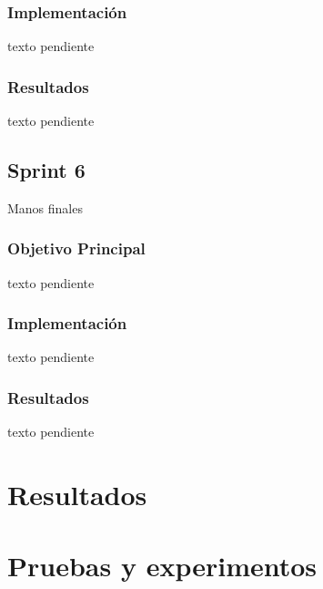 \documentclass[a4paper, 12pt]{book}
\begin{document}
\subsection{Implementación}
\label{subsec:implementacion5}
texto pendiente

\subsection{Resultados}
\label{subsec:resultados5}
texto pendiente

\section{Sprint 6}
\label{sec:sprint6}
Manos finales

\subsection{Objetivo Principal}
\label{subsec:objetivo-principal6}
texto pendiente

\subsection{Implementación}
\label{subsec:implementacion6}
texto pendiente

\subsection{Resultados}
\label{subsec:resultados6}
texto pendiente


\cleardoublepage
\chapter{Resultados}
\label{chap:resultados}



\cleardoublepage
\chapter{Pruebas y experimentos}
\label{chap:pruebas-experimentos}
\end{document}
